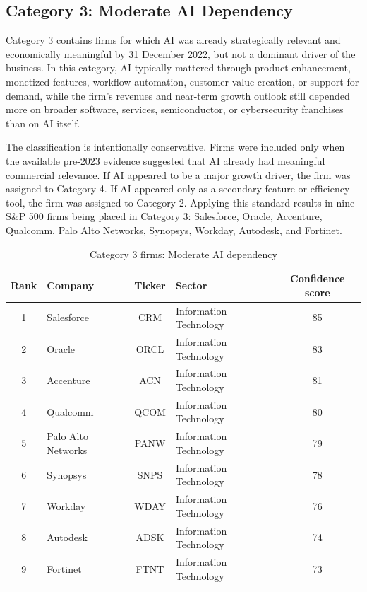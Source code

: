 \documentclass{article}
\begin{document}
\subsection{Category 3: Moderate AI Dependency}

Category 3 contains firms for which AI was already strategically relevant and economically meaningful by 31 December 2022, but not a dominant driver of the business. In this category, AI typically mattered through product enhancement, monetized features, workflow automation, customer value creation, or support for demand, while the firm’s revenues and near-term growth outlook still depended more on broader software, services, semiconductor, or cybersecurity franchises than on AI itself.

The classification is intentionally conservative. Firms were included only when the available pre-2023 evidence suggested that AI already had meaningful commercial relevance. If AI appeared to be a major growth driver, the firm was assigned to Category 4. If AI appeared only as a secondary feature or efficiency tool, the firm was assigned to Category 2. Applying this standard results in nine S\&P 500 firms being placed in Category 3: Salesforce, Oracle, Accenture, Qualcomm, Palo Alto Networks, Synopsys, Workday, Autodesk, and Fortinet.

\begin{table}[H]
\centering
\caption{Category 3 firms: Moderate AI dependency}
\begin{tabular}{|c|l|c|l|c|}
\hline
\textbf{Rank} & \textbf{Company} & \textbf{Ticker} & \textbf{Sector} & \textbf{Confidence score} \\ \hline
1 & Salesforce & CRM & Information Technology & 85 \\ \hline
2 & Oracle & ORCL & Information Technology & 83 \\ \hline
3 & Accenture & ACN & Information Technology & 81 \\ \hline
4 & Qualcomm & QCOM & Information Technology & 80 \\ \hline
5 & Palo Alto Networks & PANW & Information Technology & 79 \\ \hline
6 & Synopsys & SNPS & Information Technology & 78 \\ \hline
7 & Workday & WDAY & Information Technology & 76 \\ \hline
8 & Autodesk & ADSK & Information Technology & 74 \\ \hline
9 & Fortinet & FTNT & Information Technology & 73 \\ \hline
\end{tabular}
\label{tab:category3}
\end{table}
\end{document}
